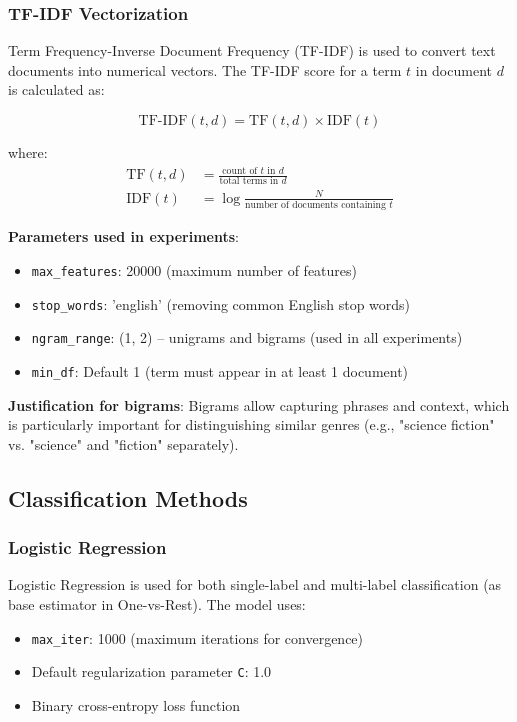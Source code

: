 \documentclass[12pt,a4paper]{article}
\begin{document}
\subsubsection{TF-IDF Vectorization}

Term Frequency-Inverse Document Frequency (TF-IDF) is used to convert text documents into numerical vectors. The TF-IDF score for a term $t$ in document $d$ is calculated as:

\begin{equation}
\text{TF-IDF}(t,d) = \text{TF}(t,d) \times \text{IDF}(t)
\end{equation}

where:
\begin{align}
\text{TF}(t,d) &= \frac{\text{count of } t \text{ in } d}{\text{total terms in } d} \\
\text{IDF}(t) &= \log\frac{N}{\text{number of documents containing } t}
\end{align}

\textbf{Parameters used in experiments}:
\begin{itemize}
    \item \texttt{max\_features}: 20000 (maximum number of features)
    \item \texttt{stop\_words}: 'english' (removing common English stop words)
    \item \texttt{ngram\_range}: (1, 2) -- unigrams and bigrams (used in all experiments)
    \item \texttt{min\_df}: Default 1 (term must appear in at least 1 document)
\end{itemize}

\textbf{Justification for bigrams}: Bigrams allow capturing phrases and context, which is particularly important for distinguishing similar genres (e.g., "science fiction" vs. "science" and "fiction" separately).

\subsection{Classification Methods}

\subsubsection{Logistic Regression}

Logistic Regression is used for both single-label and multi-label classification (as base estimator in One-vs-Rest). The model uses:

\begin{itemize}
    \item \texttt{max\_iter}: 1000 (maximum iterations for convergence)
    \item Default regularization parameter \texttt{C}: 1.0
    \item Binary cross-entropy loss function
\end{itemize}
\end{document}
